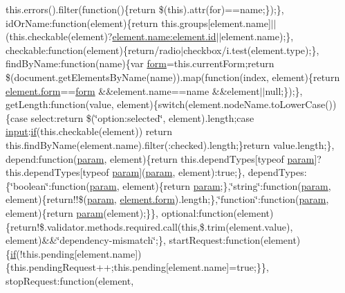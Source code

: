 \begin{DoxyCompactItemize}
this.\+errors().filter(function()\{return \$(this).attr(\textquotesingle{}for\textquotesingle{})==name;\});\}, id\+Or\+Name\+:function(element)\{return this.\+groups\mbox{[}element.\+name\mbox{]}$\vert$$\vert$(this.\+checkable(element)?\hyperlink{_facebook_8js_a9b3d01084d4285e8b0289ee3f959999b}{element.\+name\+:element.\+id}$\vert$$\vert$element.\+name);\}, checkable\+:function(element)\{return/radio$\vert$checkbox/i.\+test(element.\+type);\}, find\+By\+Name\+:function(name)\{var \hyperlink{login_8js_acfb5ebf8920e47b6c6d297e6ca2a6ce0}{form}=this.\+current\+Form;return \$(document.\+get\+Elements\+By\+Name(name)).map(function(index, element)\{return \hyperlink{login_8js_acfb5ebf8920e47b6c6d297e6ca2a6ce0}{element.\+form}==\hyperlink{login_8js_acfb5ebf8920e47b6c6d297e6ca2a6ce0}{form} \&\&element.\+name==name \&\&element$\vert$$\vert$null;\});\}, get\+Length\+:function(value, element)\{switch(element.\+node\+Name.\+to\+Lower\+Case())\{case \textquotesingle{}select\textquotesingle{}\+:return \$(\char`\"{}option\+:selected\char`\"{}, element).length;case \textquotesingle{}\hyperlink{jquery_8unobtrusive-ajax_8min_8js_a22211e450825dd03852dfba097324407}{input}\textquotesingle{}\+:\hyperlink{_scripts_2respond_8min_8js_a93851d60dd037a83509a1757b9ee7b66}{if}(this.\+checkable(element)) return this.\+find\+By\+Name(element.\+name).filter(\textquotesingle{}\+:checked\textquotesingle{}).length;\}return value.\+length;\}, depend\+:function(\hyperlink{_scripts_2jquery-1_810_82_8min_8js_ae8915303d11557d1b001bc56b6195251}{param}, element)\{return this.\+depend\+Types\mbox{[}typeof \hyperlink{_scripts_2jquery-1_810_82_8min_8js_ae8915303d11557d1b001bc56b6195251}{param}\mbox{]}?this.\+depend\+Types\mbox{[}typeof \hyperlink{_scripts_2jquery-1_810_82_8min_8js_ae8915303d11557d1b001bc56b6195251}{param}\mbox{]}(\hyperlink{_scripts_2jquery-1_810_82_8min_8js_ae8915303d11557d1b001bc56b6195251}{param}, element)\+:true;\}, depend\+Types\+:\{\char`\"{}boolean\char`\"{}\+:function(\hyperlink{_scripts_2jquery-1_810_82_8min_8js_ae8915303d11557d1b001bc56b6195251}{param}, element)\{return \hyperlink{_scripts_2jquery-1_810_82_8min_8js_ae8915303d11557d1b001bc56b6195251}{param};\},\char`\"{}string\char`\"{}\+:function(\hyperlink{_scripts_2jquery-1_810_82_8min_8js_ae8915303d11557d1b001bc56b6195251}{param}, element)\{return!!\$(\hyperlink{_scripts_2jquery-1_810_82_8min_8js_ae8915303d11557d1b001bc56b6195251}{param}, \hyperlink{login_8js_acfb5ebf8920e47b6c6d297e6ca2a6ce0}{element.\+form}).length;\},\char`\"{}function\char`\"{}\+:function(\hyperlink{_scripts_2jquery-1_810_82_8min_8js_ae8915303d11557d1b001bc56b6195251}{param}, element)\{return \hyperlink{_scripts_2jquery-1_810_82_8min_8js_ae8915303d11557d1b001bc56b6195251}{param}(element);\}\}, optional\+:function(element)\{return!\$.\+validator.\+methods.\+required.\+call(this,\$.trim(element.\+value), element)\&\&\char`\"{}dependency-\/mismatch\char`\"{};\}, start\+Request\+:function(element)\{\hyperlink{_scripts_2respond_8min_8js_a93851d60dd037a83509a1757b9ee7b66}{if}(!this.\+pending\mbox{[}element.\+name\mbox{]})\{this.\+pending\+Request++;this.\+pending\mbox{[}element.\+name\mbox{]}=true;\}\}, stop\+Request\+:function(element, 
\end{DoxyCompactItemize}
